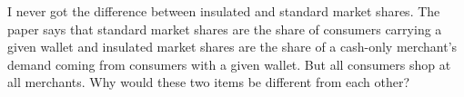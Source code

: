 \documentclass[main.tex]{subfiles}
\begin{document}
\begin{refsection}
\begin{refcomment}
I never got the difference between insulated and standard market shares.
The paper says that standard market shares are the share of consumers carrying a given wallet and insulated market shares are the share of a cash-only merchant’s demand coming from consumers with a given wallet.
But all consumers shop at all merchants.
Why would these two items be different from each other?
\end{refcomment}

\replyshares

\clearpage
\printbibliography
\end{refsection}
\end{document}
